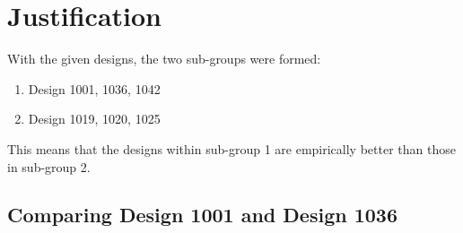 \documentclass[conference]{IEEEtran}
\begin{document}
\section{Justification}
With the given designs, the two sub-groups were formed:
\begin{enumerate}
	\item Design 1001, 1036, 1042
	\item Design 1019, 1020, 1025
\end{enumerate}
This means that the designs within sub-group 1 are empirically better than those in sub-group 2. 

\subsection{Comparing Design 1001 and Design 1036}



\end{document}
